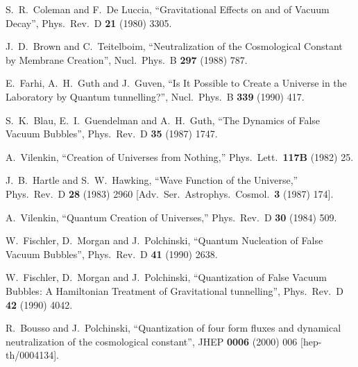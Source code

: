 \documentclass[11pt,a4paper]{article}
\begin{document}
\begin{thebibliography}{99}

  S.~R.~Coleman and F.~De Luccia,
  ``Gravitational Effects on and of Vacuum Decay'',
  Phys.\ Rev.\ D {\bf 21} (1980) 3305.
  
  J.~D.~Brown and C.~Teitelboim,
  ``Neutralization of the Cosmological Constant by Membrane Creation'',
  Nucl.\ Phys.\ B {\bf 297} (1988) 787.
  
  E.~Farhi, A.~H.~Guth and J.~Guven,
  ``Is It Possible to Create a Universe in the Laboratory by Quantum tunnelling?'',
  Nucl.\ Phys.\ B {\bf 339} (1990) 417.
  
  S.~K.~Blau, E.~I.~Guendelman and A.~H.~Guth,
  ``The Dynamics of False Vacuum Bubbles'',
  Phys.\ Rev.\ D {\bf 35} (1987) 1747.
  
A.~Vilenkin,
  ``Creation of Universes from Nothing,''
  Phys.\ Lett.\  {\bf 117B} (1982) 25.

  J.~B.~Hartle and S.~W.~Hawking,
  ``Wave Function of the Universe,''
  Phys.\ Rev.\ D {\bf 28} (1983) 2960
   [Adv.\ Ser.\ Astrophys.\ Cosmol.\  {\bf 3} (1987) 174].

  A.~Vilenkin,
  ``Quantum Creation of Universes,''
  Phys.\ Rev.\ D {\bf 30} (1984) 509.

  W.~Fischler, D.~Morgan and J.~Polchinski,
  ``Quantum Nucleation of False Vacuum Bubbles'',
  Phys.\ Rev.\ D {\bf 41} (1990) 2638.

  W.~Fischler, D.~Morgan and J.~Polchinski,
  ``Quantization of False Vacuum Bubbles: A Hamiltonian Treatment of Gravitational tunnelling'',
  Phys.\ Rev.\ D {\bf 42} (1990) 4042.
  
  R.~Bousso and J.~Polchinski,
  ``Quantization of four form fluxes and dynamical neutralization of the cosmological constant'',
  JHEP {\bf 0006} (2000) 006
  [hep-th/0004134].


\end{thebibliography}
\end{document}
